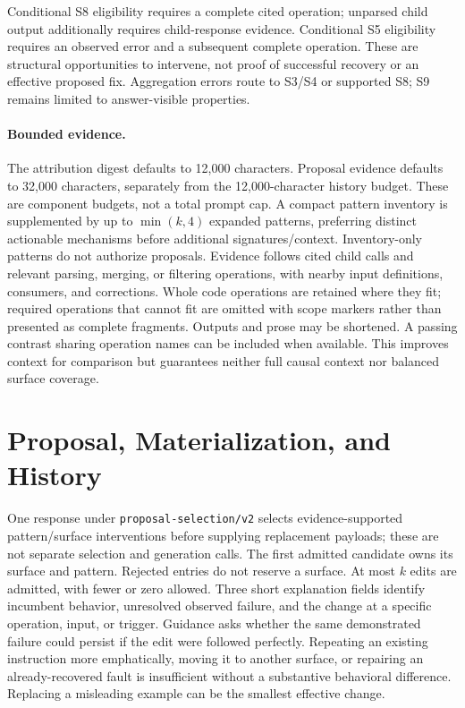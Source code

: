 Conditional S8 eligibility requires a complete cited operation; unparsed child
output additionally requires child-response evidence. Conditional S5 eligibility
requires an observed error and a subsequent complete operation. These are
structural opportunities to intervene, not proof of successful recovery or an
effective proposed fix. Aggregation errors route to S3/S4 or supported S8;
S9 remains limited to answer-visible properties.

\paragraph{Bounded evidence.}
The attribution digest defaults to 12,000 characters. Proposal evidence defaults
to 32,000 characters, separately from the 12,000-character history budget.
These are component budgets, not a total prompt cap. A compact pattern inventory
is supplemented by up to $\min(k,4)$ expanded patterns, preferring distinct
actionable mechanisms before additional signatures/context. Inventory-only
patterns do not authorize proposals. Evidence follows cited child calls and
relevant parsing, merging, or filtering operations, with nearby input definitions,
consumers, and corrections. Whole code operations are retained where they fit;
required operations that cannot fit are omitted with scope markers rather than
presented as complete fragments. Outputs and prose may be shortened. A passing
contrast sharing operation names can be included when available. This improves
context for comparison but guarantees neither full causal context nor balanced
surface coverage.

\section{Proposal, Materialization, and History}
\label{app:proposal}

One response under \texttt{proposal-selection/v2} selects evidence-supported
pattern/surface interventions before supplying replacement payloads; these are
not separate selection and generation calls. The first admitted candidate owns
its surface and pattern. Rejected entries do not reserve a surface. At most
$k$ edits are admitted, with fewer or zero allowed. Three short explanation
fields identify incumbent behavior, unresolved observed failure, and the change
at a specific operation, input, or trigger. Guidance asks whether the same
demonstrated failure could persist if the edit were followed perfectly. Repeating
an existing instruction more emphatically, moving it to another surface, or
repairing an already-recovered fault is insufficient without a substantive
behavioral difference. Replacing a misleading example can be the smallest
effective change.

